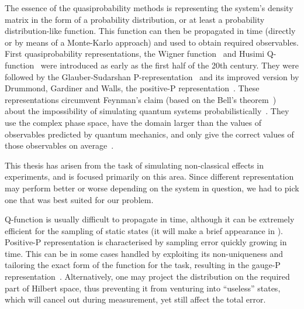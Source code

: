 The essence of the quasiprobability methods is representing the system's density matrix in the form of a probability distribution, or at least a probability distribution-like function.
This function can then be propagated in time (directly or by means of a Monte-Karlo approach) and used to obtain required observables.
First quasiprobability representations, the Wigner function~\cite{Wigner1932,Dirac1945,Moyal1947} and Husimi Q-function~\cite{Husimi1940} were introduced as early as the first half of the 20th century.
They were followed by the Glauber-Sudarshan P-representation~\cite{Sudarshan1963,Glauber1963b,Glauber1963} and its improved version by Drummond, Gardiner and Walls, the positive-P representation~\cite{Drummond1980,Drummond1981}.
These representations circumvent Feynman's claim (based on the Bell's theorem~\cite{Bell1964}) about the impossibility of simulating quantum systems probabilistically~\cite{Feynman1982}.
They use the complex phase space, have the domain larger than the values of observables predicted by quantum mechanics, and only give the correct values of those observables on average~\cite{Opanchuk2013-bell-sim}.

This thesis has arisen from the task of simulating non-classical effects in  experiments, and is focused primarily on this area.
Since different representation may perform better or worse depending on the system in question, we had to pick one that was best suited for our problem.

Q-function is usually difficult to propagate in time, although it can be extremely efficient for the sampling of static states (it will make a brief appearance in ).
Positive-P representation is characterised by sampling error quickly growing in time.
This can be in some cases handled by exploiting its non-uniqueness and tailoring the exact form of the function for the task, resulting in the gauge-P representation~\cite{Deuar2002}.
Alternatively, one may project the distribution on the required part of Hilbert space, thus preventing it from venturing into ``useless'' states, which will cancel out during measurement, yet still affect the total error.

